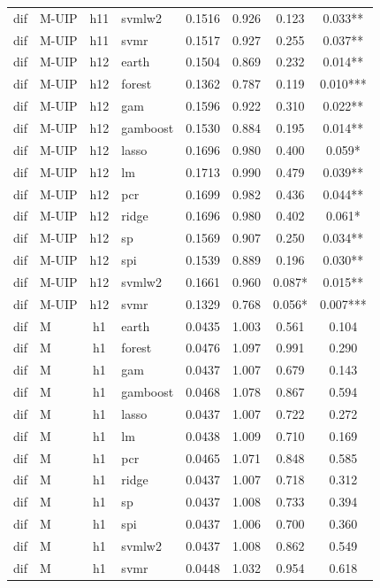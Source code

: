 \begin{ThreePartTable}
\begin{longtable}[t]{llclcccc}
dif & M-UIP & h11 & svmlw2 & 0.1516 & 0.926 & 0.123 & 0.033**\\
dif & M-UIP & h11 & svmr & 0.1517 & 0.927 & 0.255 & 0.037**\\
\addlinespace
dif & M-UIP & h12 & earth & 0.1504 & 0.869 & 0.232 & 0.014**\\
dif & M-UIP & h12 & forest & 0.1362 & 0.787 & 0.119 & 0.010***\\
dif & M-UIP & h12 & gam & 0.1596 & 0.922 & 0.310 & 0.022**\\
dif & M-UIP & h12 & gamboost & 0.1530 & 0.884 & 0.195 & 0.014**\\
dif & M-UIP & h12 & lasso & 0.1696 & 0.980 & 0.400 & 0.059*\\
dif & M-UIP & h12 & lm & 0.1713 & 0.990 & 0.479 & 0.039**\\
dif & M-UIP & h12 & pcr & 0.1699 & 0.982 & 0.436 & 0.044**\\
dif & M-UIP & h12 & ridge & 0.1696 & 0.980 & 0.402 & 0.061*\\
dif & M-UIP & h12 & sp & 0.1569 & 0.907 & 0.250 & 0.034**\\
dif & M-UIP & h12 & spi & 0.1539 & 0.889 & 0.196 & 0.030**\\
dif & M-UIP & h12 & svmlw2 & 0.1661 & 0.960 & 0.087* & 0.015**\\
dif & M-UIP & h12 & svmr & 0.1329 & 0.768 & 0.056* & 0.007***\\
\addlinespace
dif & M & h1 & earth & 0.0435 & 1.003 & 0.561 & 0.104\\
dif & M & h1 & forest & 0.0476 & 1.097 & 0.991 & 0.290\\
dif & M & h1 & gam & 0.0437 & 1.007 & 0.679 & 0.143\\
dif & M & h1 & gamboost & 0.0468 & 1.078 & 0.867 & 0.594\\
dif & M & h1 & lasso & 0.0437 & 1.007 & 0.722 & 0.272\\
dif & M & h1 & lm & 0.0438 & 1.009 & 0.710 & 0.169\\
dif & M & h1 & pcr & 0.0465 & 1.071 & 0.848 & 0.585\\
dif & M & h1 & ridge & 0.0437 & 1.007 & 0.718 & 0.312\\
dif & M & h1 & sp & 0.0437 & 1.008 & 0.733 & 0.394\\
dif & M & h1 & spi & 0.0437 & 1.006 & 0.700 & 0.360\\
dif & M & h1 & svmlw2 & 0.0437 & 1.008 & 0.862 & 0.549\\
dif & M & h1 & svmr & 0.0448 & 1.032 & 0.954 & 0.618\\

\end{longtable}
\end{ThreePartTable}
